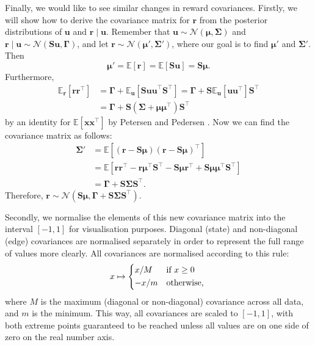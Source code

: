 \documentclass{mpaper}
\begin{document}
Finally, we would like to see similar changes in reward covariances. Firstly, we
will show how to derive the covariance matrix for $\mathbf{r}$ from the
posterior distributions of $\mathbf{u}$ and $\mathbf{r} \mid \mathbf{u}$.
Remember that $\mathbf{u} \sim \mathcal{N}(\bm\mu, \bm\Sigma)$ and $\mathbf{r}
\mid \mathbf{u} \sim \mathcal{N}(\mathbf{Su}, \bm\Gamma)$, and let $\mathbf{r}
\sim \mathcal{N}(\bm\mu', \bm\Sigma')$, where our goal is to find $\bm\mu'$ and
$\bm\Sigma'$. Then
\[
  \bm\mu' = \mathbb{E}[\mathbf{r}] = \mathbb{E}[\mathbf{Su}] = \mathbf{S}\bm\mu.
\]
Furthermore,
\begin{align*}
  \mathbb{E}_{\mathbf{r}}[\mathbf{rr}^\intercal] &= \bm\Gamma + \mathbb{E}_{\mathbf{u}}[\mathbf{Suu}^\intercal\mathbf{S}^\intercal] = \bm\Gamma + \mathbf{S}\mathbb{E}_{\mathbf{u}}[\mathbf{uu}^\intercal]\mathbf{S}^\intercal \\
                                                 &= \bm\Gamma + \mathbf{S}(\bm\Sigma + \bm\mu\bm\mu^\intercal)\mathbf{S}^\intercal
\end{align*}
by an identity for $\mathbb{E}[\mathbf{xx}^\intercal]$ by Petersen and Pedersen
\cite{petersen2008matrix}. Now we can find the covariance matrix as follows:
\begin{align*}
  \bm\Sigma' &= \mathbb{E}[(\mathbf{r} - \mathbf{S}\bm\mu)(\mathbf{r} -
               \mathbf{S}\bm\mu)^\intercal] \\
             &= \mathbb{E}[\mathbf{rr}^\intercal - \mathbf{r}\bm\mu^\intercal\mathbf{S}^\intercal - \mathbf{S}\bm\mu\mathbf{r}^\intercal + \mathbf{S}\bm\mu\bm\mu^\intercal\mathbf{S}^\intercal] \\
             &= \bm\Gamma + \mathbf{S}\bm\Sigma\mathbf{S}^\intercal.
\end{align*}
Therefore, $\mathbf{r} \sim \mathcal{N}(\mathbf{S}\bm\mu, \bm\Gamma +
\mathbf{S}\bm\Sigma\mathbf{S}^\intercal)$.

Secondly, we normalise the elements of this new covariance matrix into the
interval $[-1, 1]$ for visualisation purposes. Diagonal (state) and non-diagonal
(edge) covariances are normalised separately in order to represent the full
range of values more clearly. All covariances are normalised according to this
rule:
\[
  x \mapsto
  \begin{cases*}
    x/M & if $x \ge 0$ \\
    -x/m & otherwise,
  \end{cases*}
\]
where $M$ is the maximum (diagonal or non-diagonal) covariance across all data,
and $m$ is the minimum. This way, all covariances are scaled to $[-1, 1]$, with
both extreme points guaranteed to be reached unless all values are on one side
of zero on the real number axis.
\end{document}
